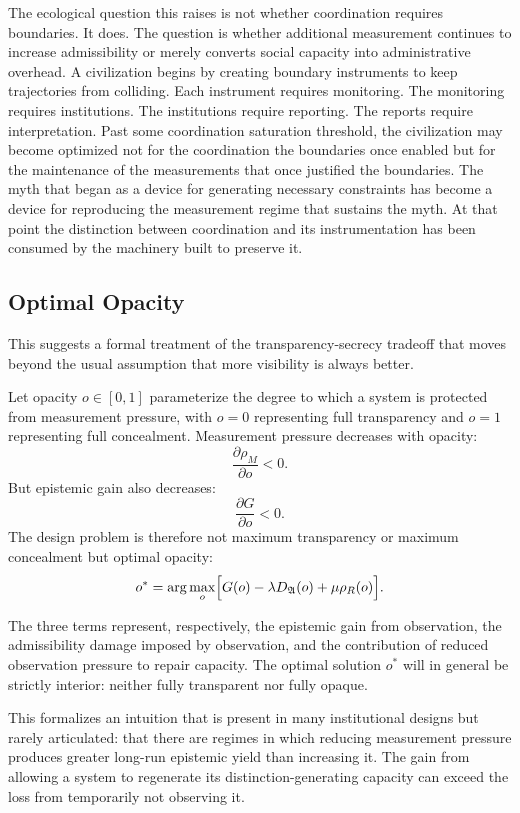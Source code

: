 \documentclass[12pt, a4paper]{article}
\theoremstyle{flyxion}
\newcommand{\fA}{\mathfrak{A}}
\newcommand{\DA}{D_{\fA}}
\newcommand{\rhoM}{\rho_{M}}
\newcommand{\rhoR}{\rho_{R}}
\begin{document}
The ecological question this raises is not whether coordination requires boundaries. It does. The question is whether additional measurement continues to increase admissibility or merely converts social capacity into administrative overhead. A civilization begins by creating boundary instruments to keep trajectories from colliding. Each instrument requires monitoring. The monitoring requires institutions. The institutions require reporting. The reports require interpretation. Past some coordination saturation threshold, the civilization may become optimized not for the coordination the boundaries once enabled but for the maintenance of the measurements that once justified the boundaries. The myth that began as a device for generating necessary constraints has become a device for reproducing the measurement regime that sustains the myth. At that point the distinction between coordination and its instrumentation has been consumed by the machinery built to preserve it.

\subsection*{Optimal Opacity}

This suggests a formal treatment of the transparency-secrecy tradeoff that moves beyond the usual assumption that more visibility is always better.

Let opacity $o \in [0,1]$ parameterize the degree to which a system is protected from measurement pressure, with $o = 0$ representing full transparency and $o = 1$ representing full concealment. Measurement pressure decreases with opacity:
\[
  \frac{\partial \rhoM}{\partial o} < 0.
\]
But epistemic gain also decreases:
\[
  \frac{\partial G}{\partial o} < 0.
\]
The design problem is therefore not maximum transparency or maximum concealment but optimal opacity:
\[
  o^* = \arg\max_{o} \Bigl[ G(o) - \lambda \DA(o) + \mu \rhoR(o) \Bigr].
\]

The three terms represent, respectively, the epistemic gain from observation, the admissibility damage imposed by observation, and the contribution of reduced observation pressure to repair capacity. The optimal solution $o^*$ will in general be strictly interior: neither fully transparent nor fully opaque.

This formalizes an intuition that is present in many institutional designs but rarely articulated: that there are regimes in which reducing measurement pressure produces greater long-run epistemic yield than increasing it. The gain from allowing a system to regenerate its distinction-generating capacity can exceed the loss from temporarily not observing it.
\end{document}
